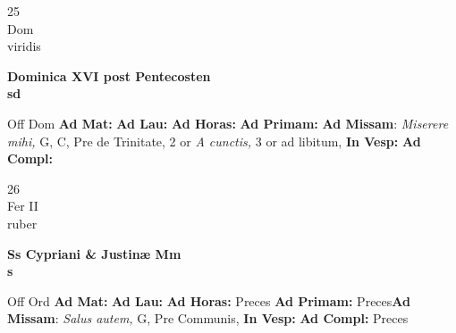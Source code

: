 \documentclass[10pt, openany]{book}
\begin{document}
    \begin{center}
        \begin{minipage}{3.5in}
            \vspace{2em}
            \begin{minipage}{0.5in}
                {\Huge 25} \\
                {\normalsize Dom} \\
                {\normalsize viridis}
            \end{minipage}
            \begin{minipage}{3.0in}
                \textbf{ \large Dominica XVI post Pentecosten \\
                \textnormal{\normalsize sd}} \\ 
            \end{minipage}
            \begin{justify}Off Dom
                \textbf{Ad Mat: }
                \textbf{Ad Lau: }
                \textbf{Ad Horas: }
                \textbf{Ad Primam: }\textbf{Ad Missam}: \textit{Miserere mihi,} G, C, Pre de Trinitate, 2 or \textit{A cunctis,} 3 or ad libitum,  
                \textbf{In Vesp: }
                \textbf{Ad Compl: }
            \end{justify}
        \end{minipage}
    \end{center}

    \begin{center}
        \begin{minipage}{3.5in}
            \vspace{2em}
            \begin{minipage}{0.5in}
                {\Huge 26} \\
                {\normalsize Fer II} \\
                {\normalsize ruber}
            \end{minipage}
            \begin{minipage}{3.0in}
                \textbf{ \large Ss Cypriani \& Justinæ Mm \\
                \textnormal{\normalsize s}} \\ 
            \end{minipage}
            \begin{justify}Off Ord
                \textbf{Ad Mat: }
                \textbf{Ad Lau: }
                \textbf{Ad Horas: }Preces
                \textbf{Ad Primam: }Preces\textbf{Ad Missam}: \textit{Salus autem,} G, Pre Communis,  
                \textbf{In Vesp: }
                \textbf{Ad Compl: }Preces
            \end{justify}
        \end{minipage}
    \end{center}
\end{document}
